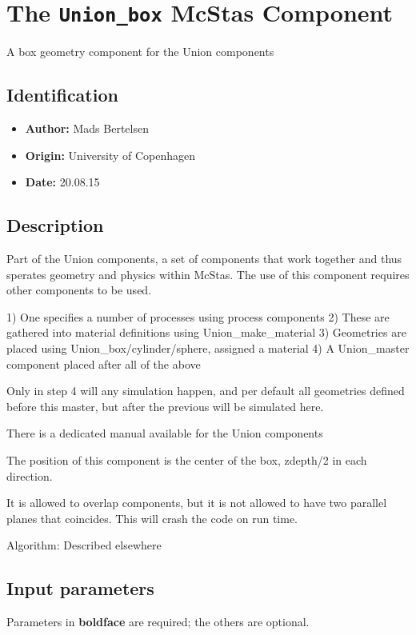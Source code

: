 \section{The \texttt{Union\_box} McStas Component}
A box geometry component for the Union components

\subsection*{Identification}
\begin{itemize}
  \item \textbf{Author:} Mads Bertelsen
  \item \textbf{Origin:} University of Copenhagen
  \item \textbf{Date:} 20.08.15
\end{itemize}

\subsection*{Description}
Part of the Union components, a set of components that work together and thus sperates geometry and physics within McStas. The use of this component requires other components to be used.

1) One specifies a number of processes using process components 2) These are gathered into material definitions using Union\_make\_material 3) Geometries are placed using Union\_box/cylinder/sphere, assigned a material 4) A Union\_master component placed after all of the above

Only in step 4 will any simulation happen, and per default all geometries defined before this master, but after the previous will be simulated here.

There is a dedicated manual available for the Union components

The position of this component is the center of the box, zdepth/2 in each direction.

It is allowed to overlap components, but it is not allowed to have two parallel planes that coincides. This will crash the code on run time.

Algorithm: Described elsewhere

\subsection*{Input parameters}
Parameters in \textbf{boldface} are required; the others are optional.

